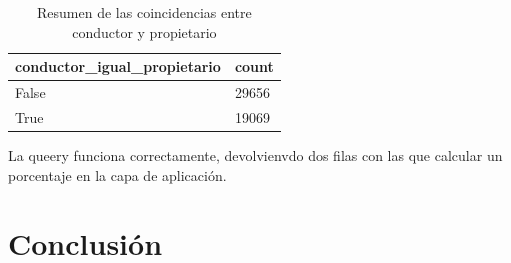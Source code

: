 \documentclass[]{article}
\begin{document}
\begin{itemize}
\begin{table}[H]
\begin{longtable}{l l}
    \hline
    \textbf{conductor\_igual\_propietario} & \textbf{count} \\ \hline
    \endhead
    
    False & 29656 \\ \hline
    True & 19069 \\ \hline
    
\end{longtable}
\caption{Resumen de las coincidencias entre conductor y propietario}
\end{table}

La queery funciona correctamente, devolvienvdo dos filas con las que calcular un porcentaje en la capa de aplicación.

\end{itemize}

\newpage
\section{Conclusión}
\label{sec:conclusion}
\end{document}
